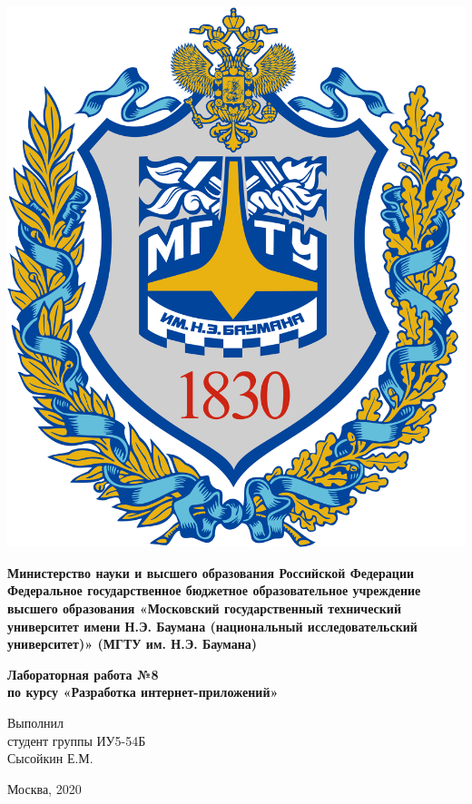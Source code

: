 \documentclass[20pt,a4paper]{report}
\begin{document}
	\begin{titlepage}
		\begin{minipage}{0.3\textwidth}
		\includegraphics[scale=0.03]{logo.png}	
		\end{minipage}
		\begin{minipage}{0.6\textwidth}\centering
			\textbf{
				Министерство науки и высшего образования Российской Федерации
				Федеральное государственное бюджетное образовательное 
				учреждение высшего образования
				«Московский государственный технический университет
				имени Н.Э. Баумана (национальный исследовательский университет)»
				(МГТУ им. Н.Э. Баумана)
			}	
		\end{minipage}
	
		\vspace{5cm}
		\centering
		\Large
		\textbf{
			Лабораторная работа №8 \\
			по курсу «Разработка интернет-приложений» \\
		}

		\vspace{6cm}
		\begin{flushright}
			Выполнил \\ 
			студент группы ИУ5-54Б \\ 
			Сысойкин Е.М. 
		\end{flushright}
		\vspace{5cm}
		Москва, 2020
	\end{titlepage}
\end{document}
